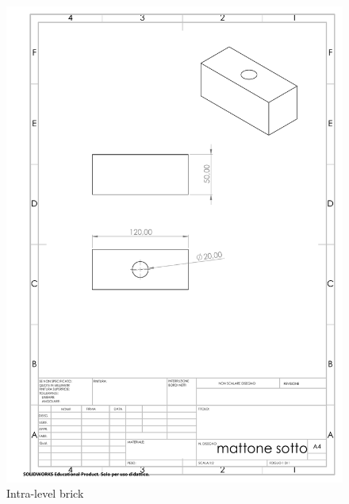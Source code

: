 \documentclass{article}
\begin{document}
\newpage
\begin{figure}[H]
    \centering
    \includegraphics[width=.9\linewidth]{technical_drawings/mattone_sotto.pdf}
    \caption{Intra-level brick}
    \label{fig:mattone_sotto}
\end{figure}
\end{document}
